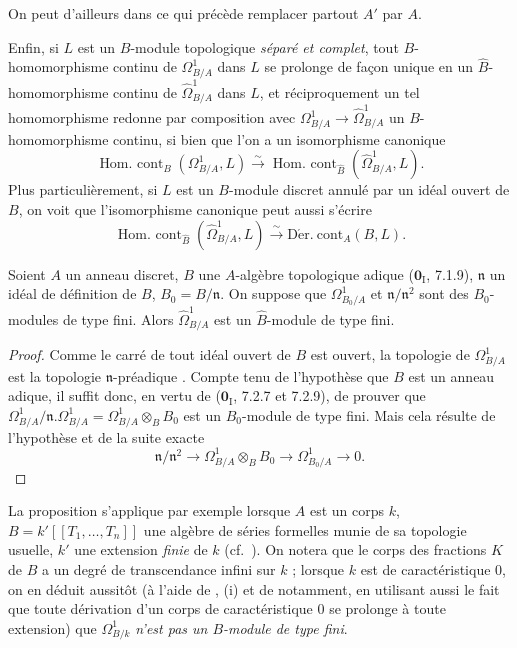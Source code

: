\begin{env}[20.7.14]
On peut d'ailleurs dans ce qui précède remplacer partout $A'$ par $A$.

Enfin, si $L$ est un $B$-module topologique \emph{séparé et complet}, tout
$B$-homomorphisme continu de $\Omega^1_{B/A}$ dans $L$ se prolonge de façon
unique en un $\widehat B$-homomorphisme continu de
$\widehat{\Omega}^1_{B/A}$ dans $L$, et réciproquement un tel homomorphisme
redonne par composition avec $\Omega^1_{B/A}\to\widehat{\Omega}^1_{B/A}$ un
$B$-homomorphisme continu, si bien que l'on a un isomorphisme canonique
\[
  \operatorname{Hom.\ cont}_B(\Omega^1_{B/A},L)\xrightarrow{\sim}
  \operatorname{Hom.\ cont}_{\widehat B}(\widehat{\Omega}^1_{B/A},L).
\]
Plus particulièrement, si $L$ est un $B$-module discret annulé par un idéal
ouvert de $B$, on voit que l'isomorphisme canonique
 peut aussi s'écrire
\begin{equation}
\tag{20.7.14.4}
\label{0.20.7.14.4-fr}
  \operatorname{Hom.\ cont}_{\widehat B}(\widehat{\Omega}^1_{B/A},L)
  \xrightarrow{\sim}\operatorname{D\acute{e}r.\ cont}_A(B,L).
\end{equation}
\end{env}

\begin{proposition}[20.7.15]
\label{0.20.7.15-fr}
Soient $A$ un anneau discret, $B$ une $A$-algèbre topologique adique
($\mathbf{0}_{\mathrm I}$, 7.1.9), $\mathfrak{n}$ un idéal de définition de
$B$, $B_0=B/\mathfrak{n}$. On suppose que $\Omega^1_{B_0/A}$ et
$\mathfrak{n}/\mathfrak{n}^2$ sont des $B_0$-modules de type fini. Alors
$\widehat{\Omega}^1_{B/A}$ est un $\widehat B$-module de type fini.
\end{proposition}

\begin{proof}
Comme le carré de tout idéal ouvert de $B$ est ouvert, la topologie de
$\Omega^1_{B/A}$ est la topologie $\mathfrak{n}$-préadique
. Compte tenu de l'hypothèse que $B$ est un anneau adique,
il suffit donc, en vertu de ($\mathbf{0}_{\mathrm I}$, 7.2.7 et 7.2.9), de
prouver
que $\Omega^1_{B/A}/\mathfrak{n}.\Omega^1_{B/A}=
\Omega^1_{B/A}\otimes_B B_0$ est un $B_0$-module de type fini. Mais cela
résulte de l'hypothèse et de la suite exacte 
\[
  \mathfrak{n}/\mathfrak{n}^2\to
  \Omega^1_{B/A}\otimes_B B_0\to\Omega^1_{B_0/A}\to0.
\]
\end{proof}

\begin{env}[20.7.16]
\label{0.20.7.16-fr}
La proposition  s'applique par exemple lorsque $A$ est un
corps $k$, $B=k'[[T_1,\ldots,T_n]]$ une algèbre de séries formelles munie de
sa topologie usuelle, $k'$ une extension \emph{finie} de $k$ (cf.\
). On notera que le corps des fractions $K$ de $B$ a un
degré de transcendance infini sur $k$ ; lorsque $k$ est de caractéristique
$0$, on en déduit aussitôt (à l'aide de \sref{0.20.4.13-fr}, (i) et de
\sref{0.20.5.9-fr} notamment, en utilisant aussi le fait que toute dérivation
d'un corps de caractéristique $0$ se prolonge à toute extension) que
$\Omega^1_{B/k}$ \emph{n'est pas un $B$-module de type fini}.
\end{env}

